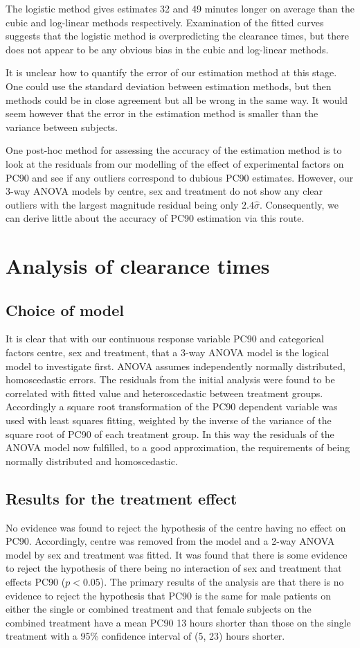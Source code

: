 The logistic method gives estimates 32 and 49 minutes longer on average than the cubic and log-linear methods respectively. Examination of the fitted curves suggests that the logistic method is overpredicting the clearance times, but there does not appear to be any obvious bias in the cubic and log-linear methods.

It is unclear how to quantify the error of our estimation method at this stage. One could use the standard deviation between estimation methods, but then methods could be in close agreement but all be wrong in the same way. It would seem however that the error in the estimation method is smaller than the variance between subjects. 

One post-hoc method for assessing the accuracy of the estimation method is to look at the residuals from our modelling of the effect of experimental factors on PC90 and see if any outliers correspond to dubious PC90 estimates. However, our 3-way ANOVA models by centre, sex and treatment do not show any clear outliers with the largest magnitude residual being only $2.4\hat{\sigma}$. Consequently, we can derive little about the accuracy of PC90 estimation via this route.

\section{Analysis of clearance times}
\subsection{Choice of model}
It is clear that with our continuous response variable PC90 and categorical factors centre, sex and treatment, that a 3-way ANOVA model is the logical model to investigate first. ANOVA assumes independently normally distributed, homoscedastic 
errors. The residuals from the initial analysis were found to be correlated with fitted value and heteroscedastic between treatment groups. Accordingly a square root transformation of the PC90 dependent variable was used with least squares fitting, weighted by the inverse of the variance of the square root of PC90 of each treatment group. In this way the residuals of the ANOVA model now fulfilled, to a good approximation, the requirements of being normally distributed and homoscedastic.

\subsection{Results for the treatment effect}
No evidence was found to reject the hypothesis of the centre having no effect on PC90. Accordingly, centre was removed from the model and a 2-way ANOVA model by sex and treatment was fitted. It was found that there is some evidence to reject the hypothesis of there being no interaction of sex and treatment that effects PC90 ($p<0.05$). The primary results of the analysis are that there is no evidence to reject the hypothesis that PC90 is the same for male patients on either the single or combined treatment and that female subjects on the combined treatment have a mean PC90 13 hours shorter than those on the single treatment with a 95\% confidence interval of (5, 23) hours shorter.

